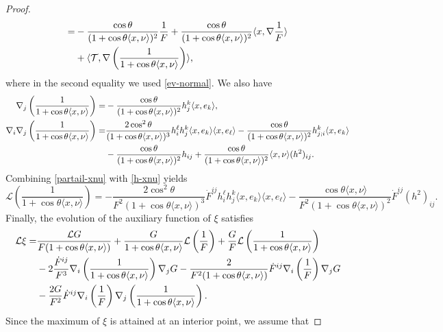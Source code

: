 \documentclass[11pt,reqno]{amsart}
\theoremstyle{definition}
\theoremstyle{remark}
\numberwithin{equation}{section}
\renewcommand{\(}{\left(}
\renewcommand{\)}{\right)}
\renewcommand{\-}{\overline}
\begin{document}
\begin{proof}
\begin{align}
	=&-\frac{\cos\theta}{(1+\cos\theta\langle x,\nu\rangle)^2}\frac{1}{F}+\frac{\cos\theta}{(1+\cos\theta\langle x,\nu\rangle)^2}\langle x,\nabla \frac{1}{F}\rangle\notag\\
	&+\langle \mathcal{T},\nabla\left(\frac{1}{1+\cos\theta\langle x,\nu\rangle}\right)\rangle,\label{partail-xnu}
\end{align}
where in the second equality we used \eqref{ev-normal}.
We also have
\begin{align}
	\nabla_j\left(\frac{1}{1+\cos\theta\langle x,\nu\rangle}\right)=&-\frac{\cos\theta}{(1+\cos\theta\langle x,\nu\rangle)^2}h_j^k\langle x,e_k\rangle,\label{n-xnu}\\
	\nabla_i\nabla_j\left(\frac{1}{1+\cos\theta\langle x,\nu\rangle}\right)=&\frac{2\cos^2\theta}{(1+\cos\theta\langle x,\nu\rangle)^3}h_i^{\ell}h_j^k \langle x,e_k\rangle\langle x,e_{\ell}\rangle-\frac{\cos\theta}{(1+\cos\theta\langle x,\nu\rangle)^2}h_{j;i}^k\langle x,e_k\rangle\notag\\
	&-\frac{\cos\theta}{(1+\cos\theta\langle x,\nu\rangle)^2}h_{ij}+\frac{\cos\theta}{(1+\cos\theta\langle x,\nu\rangle)^2}\langle x,\nu\rangle(h^2)_{ij}.\label{h-xnu}
\end{align}
Combining \eqref{partail-xnu} with \eqref{h-xnu} yields
\begin{equation}
	\mathcal{L}\left(\frac{1}{1+\cos\theta\langle x,\nu\rangle}\right)=-\frac{2\cos^2\theta}{F^2(1+\cos\theta\langle x,\nu\rangle)^3}\dot{F}^{ij}h_i^{\ell}h_j^k \langle x,e_k\rangle\langle x,e_{\ell}\rangle-\frac{\cos\theta\langle x,\nu\rangle
	}{F^2(1+\cos\theta\langle x,\nu\rangle)^2}\dot{F}^{ij}(h^2)_{ij}.\label{L1xnu}
\end{equation}
Finally,  the evolution of the auxiliary function of $\xi$ satisfies
\begin{align}
	\mathcal{L}{\xi}=&\frac{\mathcal{L}G}{F(1+\cos\theta\langle x,\nu \rangle)}+\frac{G}{1+\cos\theta\langle x,\nu \rangle}\mathcal{L}\left(\frac{1}{F}\right)+\frac{G}{F}\mathcal{L}\left(\frac{1}{1+\cos\theta\langle x,\nu \rangle}\right)\notag\\
	&-2\frac{\dot{F}^{ij}}{F^3}\nabla_i\left(\frac{1}{1+\cos\theta\langle x,\nu \rangle}\right)\nabla_j{G}-\frac{2}{F^2(1+\cos\theta\langle x,\nu \rangle)}\dot{F}^{ij}\nabla_i\left(\frac{1}{F}\right)\nabla_j G\notag\\
	&-\frac{2G}{F^2}\dot{F}^{ij}\nabla_i\left(\frac{1}{F}\right)\nabla_j\left(\frac{1}{1+\cos\theta\langle x,\nu \rangle}\right).\label{Lxi-1}
\end{align}
Since the maximum of $\xi$ is attained at an interior point, we assume that 

\end{proof}
\end{document}
